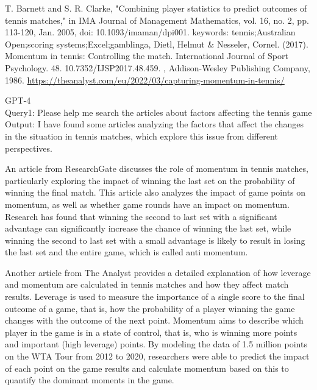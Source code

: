\documentclass{mcmthesis}
\begin{document}
\begin{thebibliography}{99}
 T. Barnett and S. R. Clarke, "Combining player statistics to predict outcomes of tennis matches," in IMA Journal of Management Mathematics, vol. 16, no. 2, pp. 113-120, Jan. 2005, doi: 10.1093/imaman/dpi001.
keywords: {tennis;Australian Open;scoring systems;Excel;gamblinga},
 Dietl, Helmut \& Nesseler, Cornel. (2017). Momentum in tennis: Controlling the match. International Journal of Sport Psychology. 48. 10.7352/IJSP2017.48.459. ,
Addison-Wesley Publishing Company, 1986.
\url{https://theanalyst.com/eu/2022/03/capturing-momentum-in-tennis/}
\end{thebibliography}

\AImatter

\begin{ReportAiUse}{9}
GPT-4\\
Query1: Please help me search the articles about factors affecting the tennis game\\
Output: I have found some articles analyzing the factors that affect the changes in the situation in tennis matches, which explore this issue from different perspectives.

An article from ResearchGate discusses the role of momentum in tennis matches, particularly exploring the impact of winning the last set on the probability of winning the final match. This article also analyzes the impact of game points on momentum, as well as whether game rounds have an impact on momentum. Research has found that winning the second to last set with a significant advantage can significantly increase the chance of winning the last set, while winning the second to last set with a small advantage is likely to result in losing the last set and the entire game, which is called anti momentum.

Another article from The Analyst provides a detailed explanation of how leverage and momentum are calculated in tennis matches and how they affect match results. Leverage is used to measure the importance of a single score to the final outcome of a game, that is, how the probability of a player winning the game changes with the outcome of the next point. Momentum aims to describe which player in the game is in a state of control, that is, who is winning more points and important (high leverage) points. By modeling the data of 1.5 million points on the WTA Tour from 2012 to 2020, researchers were able to predict the impact of each point on the game results and calculate momentum based on this to quantify the dominant moments in the game.


\end{ReportAiUse}
\end{document}

